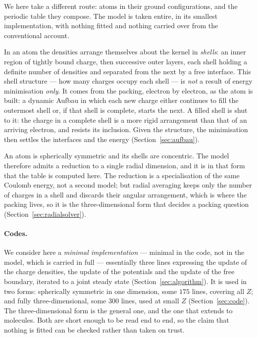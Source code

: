\documentclass[11pt]{article}
\begin{document}
We here take a different route: atoms in their ground configurations, and the periodic table
they compose. The model is taken entire, in its smallest implementation, with nothing fitted and
nothing carried over from the conventional account.

In an atom the densities arrange themselves about the kernel in \emph{shells}: an inner
region of tightly bound charge, then successive outer layers, each shell holding a definite
number of densities and separated from the next by a free interface. This shell structure ---
how many charges occupy each shell --- is \emph{not} a result of energy minimisation
\emph{only}. It comes from the packing, electron by electron, as the atom is built: a dynamic Aufbau in which
each new charge either continues to fill the outermost shell or, if that shell is complete,
starts the next. A filled shell is shut to it: the charge in a complete shell is a
more rigid arrangement than that of an arriving electron, and resists its inclusion. Given the structure, the
minimisation then settles the interfaces and the energy (Section~\ref{sec:aufbau}).

An atom is spherically symmetric and its shells are concentric. The model therefore admits a
reduction to a single radial dimension, and it is in that form that the table is computed
here. The reduction is a specialisation of the same Coulomb energy, not a second model; but
radial averaging keeps only the number of charges in a shell and discards their angular
arrangement, which is where the packing lives, so it is the three-dimensional form that
decides a packing question (Section~\ref{sec:radialsolver}).

\paragraph{Codes.} We consider here a \emph{minimal implementation} --- minimal in the code,
not in the model, which is carried in full --- essentially three lines expressing the update of
the charge densities, the update of the potentials and the update of the free boundary,
iterated to a joint steady state (Section~\ref{sec:algorithm}). It is used in two
forms: spherically symmetric in one dimension, some $175$ lines, covering all $Z$; and fully
three-dimensional, some $300$ lines, used at small $Z$ (Section~\ref{sec:code}). The three-dimensional form is the general one, and the one that
extends to molecules. Both are short enough to be read end to end, so the
claim that nothing is fitted can be checked rather than taken on trust.
\end{document}
